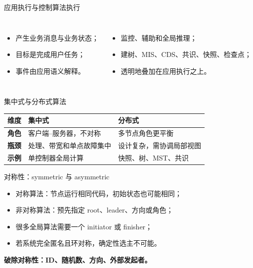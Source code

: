 \documentclass[UTF8,fontset=none,aspectratio=169,10pt]{beamer}
\begin{document}
\begin{frame}{应用执行与控制算法执行}
\begin{columns}[T,onlytextwidth]
\begin{itemize}
  \item 产生业务消息与业务状态；
  \item 目标是完成用户任务；
  \item 事件由应用语义解释。
\end{itemize}
\begin{itemize}
  \item 监控、辅助和全局推理；
  \item 建树、MIS、CDS、共识、快照、检查点；
  \item 透明地叠加在应用执行之上。
\end{itemize}
\end{columns}
\vfill
{}
\end{frame}

\begin{frame}{集中式与分布式算法}
\begin{tabularx}{\linewidth}{>{\bfseries}p{2.5cm}XX}
\toprule
维度 & 集中式 & 分布式 \\
\midrule
角色 & 客户端--服务器，不对称 & 多节点角色更平衡 \\
瓶颈 & 处理、带宽和单点故障集中 & 设计复杂，需协调局部视图 \\
示例 & 单控制器全局计算 & 快照、树、MST、共识 \\
\bottomrule
\end{tabularx}
\vfill
{}
\end{frame}

\begin{frame}{对称性：symmetric 与 asymmetric}
\begin{itemize}
  \item 对称算法：节点运行相同代码，初始状态也可能相同；
  \item 非对称算法：预先指定 root、leader、方向或角色；
  \item 很多全局算法需要一个 initiator 或 finisher；
  \item 若系统完全匿名且环对称，确定性选主不可能。
\end{itemize}
\vfill
\begin{center}\Large\color{ADSOrange}\bfseries 破除对称性：ID、随机数、方向、外部发起者。\end{center}
\end{frame}
\end{document}
